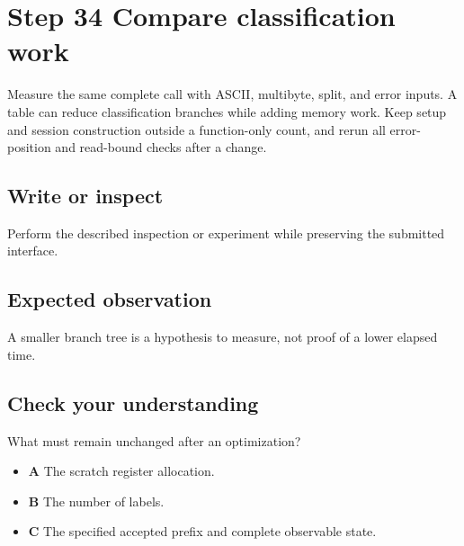 \section{Step 34 Compare classification work}\label{utf8-s34}

Measure the same complete call with ASCII, multibyte, split, and error inputs. A table can reduce classification branches while adding memory work. Keep setup and session construction outside a function-only count, and rerun all error-position and read-bound checks after a change.

\subsection{Write or inspect}
Perform the described inspection or experiment while preserving the submitted interface.

\subsection{Expected observation}
A smaller branch tree is a hypothesis to measure, not proof of a lower elapsed time.

\subsection{Check your understanding}
What must remain unchanged after an optimization?

\begin{itemize}
  \item \textbf{A} The scratch register allocation.
  \item \textbf{B} The number of labels.
  \item \textbf{C} The specified accepted prefix and complete observable state.
\end{itemize}
